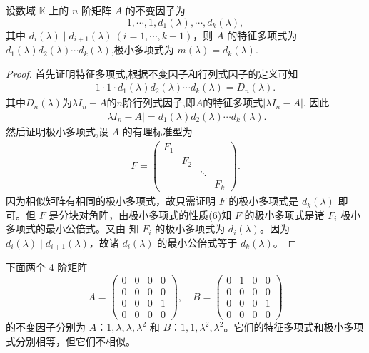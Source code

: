 \documentclass[../../main.tex]{subfiles}
\begin{document}
\begin{theorem}[极小多项式就是幂次最大的不变因子]\label{theorem:极小多项式与不变因子的关系}
设数域 $\mathbb{K}$ 上的 $n$ 阶矩阵 $A$ 的不变因子为
\[
1,\cdots,1,d_1(\lambda),\cdots,d_k(\lambda),
\]
其中 $d_i(\lambda)\mid d_{i + 1}(\lambda)\ (i = 1,\cdots,k - 1)$，则 $A$ 的特征多项式为$d_1(\lambda)d_2(\lambda)\cdots d_k(\lambda)$,极小多项式为 $m(\lambda)=d_k(\lambda)$.
\end{theorem}
\begin{proof}
首先证明特征多项式,根据不变因子和行列式因子的定义可知
\begin{align*}
1\cdot 1\cdot d_1(\lambda)d_2(\lambda)\cdots d_k(\lambda)=D_n(\lambda).
\end{align*}
其中$D_n(\lambda)$为$\lambda I_n-A$的$n$阶行列式因子,即$A$的特征多项式$|\lambda I_n-A|$.
因此
\begin{align*}
|\lambda I_n-A|=d_1(\lambda)d_2(\lambda)\cdots d_k(\lambda).
\end{align*}
然后证明极小多项式,设 $A$ 的有理标准型为
\begin{align*}
F = \begin{pmatrix}
F_1 & & & \\
& F_2 & & \\
& & \ddots & \\
& & & F_k
\end{pmatrix}.
\end{align*}
因为相似矩阵有相同的极小多项式，故只需证明 $F$ 的极小多项式是 $d_k(\lambda)$ 即可。但 $F$ 是分块对角阵，由\hyperref[proposition:极小多项式的性质]{极小多项式的性质(6)}知 $F$ 的极小多项式是诸 $F_i$ 极小多项式的最小公倍式。又由 知 $F_i$ 的极小多项式为 $d_i(\lambda)$。因为 $d_i(\lambda)\mid d_{i + 1}(\lambda)$，故诸 $d_i(\lambda)$ 的最小公倍式等于 $d_k(\lambda)$。
\end{proof}

\begin{example}
下面两个 4 阶矩阵
\[
A = \begin{pmatrix}
0 & 0 & 0 & 0 \\
0 & 0 & 0 & 0 \\
0 & 0 & 0 & 1 \\
0 & 0 & 0 & 0
\end{pmatrix}, \quad
B = \begin{pmatrix}
0 & 1 & 0 & 0 \\
0 & 0 & 0 & 0 \\
0 & 0 & 0 & 1 \\
0 & 0 & 0 & 0
\end{pmatrix}
\]
的不变因子分别为 $A$：$1,\lambda,\lambda,\lambda^2$ 和 $B$：$1,1,\lambda^2,\lambda^2$。它们的特征多项式和极小多项式分别相等，但它们不相似。 
\end{example}
\end{document}
